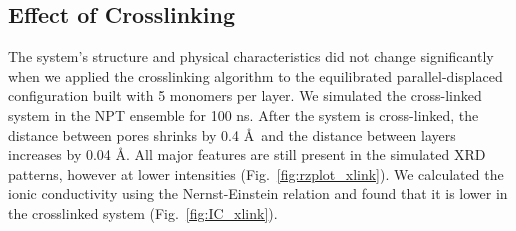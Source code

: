 \documentclass{article}
\begin{document}
  \subsection{Effect of Crosslinking}\label{section:xlink}

  The system's structure and physical characteristics did not change
  significantly when we applied the crosslinking algorithm to the equilibrated
  parallel-displaced configuration built with 5 monomers per layer. We simulated
  the cross-linked system in the NPT ensemble for 100 ns. After the system is
  cross-linked, the distance between pores shrinks by 0.4 \AA~and the distance
  between layers increases by 0.04 \AA. All major features are still present in
  the simulated XRD patterns, however at lower intensities
  (Fig.~\ref{fig:rzplot_xlink}). We calculated the ionic conductivity using the
  Nernst-Einstein relation and found that it is lower in the crosslinked system
  (Fig.~\ref{fig:IC_xlink}).
\end{document}
